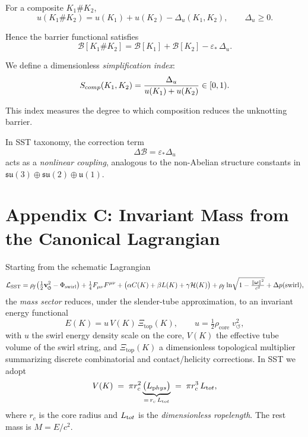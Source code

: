 \documentclass[11pt]{article}
\newcommand{\swirlarrow}{%
     \mathchoice{\mkern-2mu\scriptstyle\boldsymbol{\circlearrowleft}}%
                {\mkern-2mu\scriptstyle\boldsymbol{\circlearrowleft}}%
                {\mkern-2mu\scriptscriptstyle\boldsymbol{\circlearrowleft}}%
                {\mkern-2mu\scriptscriptstyle\boldsymbol{\circlearrowleft}}%
}
\newcommand{\vswirl}{\mathbf{v}_{\swirlarrow}}
\newcommand{\rhof}{\rho_{\!f}}                           %
\begin{document}

For a composite $K_1 \# K_2$,
\[
    u(K_1 \# K_2)
    = u(K_1) + u(K_2) - \Delta_u(K_1,K_2),
    \qquad \Delta_u \ge 0.
\]

Hence the barrier functional satisfies
\[
    \mathcal B[K_1 \# K_2]
    = \mathcal B[K_1] + \mathcal B[K_2] - \varepsilon_*\,\Delta_u.
\]

We define a dimensionless \emph{simplification index}:
\[
    S_{\textrm comp}(K_1,K_2)
    = \frac{\Delta_u}{u(K_1)+u(K_2)} \in [0,1).
\]

This index measures the degree to which composition
reduces the unknotting barrier.

\medskip

In SST taxonomy, the correction term
\[
    \Delta\mathcal B = \varepsilon_* \Delta_u
\]
acts as a \emph{nonlinear coupling},
analogous to the non-Abelian structure constants
in $\mathfrak{su}(3)\oplus\mathfrak{su}(2)\oplus\mathfrak{u}(1)$.



\section*{Appendix C: Invariant Mass from the Canonical Lagrangian}

Starting from the schematic Lagrangian
\[
    \mathcal{L}_{\text{SST}}
    = \rhof\!\left(\tfrac{1}{2}\vswirl^2 - \Phi_{\text{swirl}}\right)
    + \tfrac{1}{4}F_{\mu\nu}F^{\mu\nu}
    + \big(\alpha C(K)+\beta L(K)+\gamma \mathcal{H}(K)\big)
    + \rhof \ln\!\sqrt{1-\tfrac{\|\boldsymbol\omega\|^2}{c^2}}
    + \Delta p(\text{swirl}),
\]
the \emph{mass sector} reduces, under the slender-tube approximation, to an invariant energy functional
\[
    E(K)= u\,V(K)\,\Xi_{\text{top}}(K),\qquad
    u=\tfrac{1}{2}\rho_{\text{core}}\;v_{\circlearrowleft}^{2},
\]
with $u$ the swirl energy density scale on the core, $V(K)$ the effective tube volume of the swirl string, and $\Xi_{\text{top}}(K)$ a dimensionless topological multiplier summarizing discrete combinatorial and contact/helicity corrections. In SST we adopt
\[
    V(K)\;=\;\pi r_c^2 \underbrace{\big(L_{\textrm phys}\big)}_{=\,r_c\,L_{\textrm tot}}
    \;=\;\pi r_c^3\,L_{\textrm tot},
\]
where $r_c$ is the core radius and $L_{\textrm tot}$ is the \emph{dimensionless ropelength}. The rest mass is $M=E/c^2$.
\end{document}
